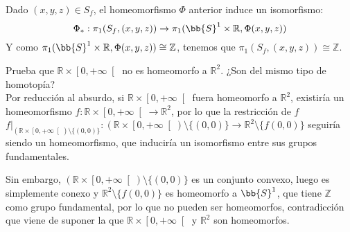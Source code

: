 \begin{ejercicio}
\begin{enumerate}[label=\alph*)]
            Dado $(x,y,z)\in S_f$, el homeomorfismo $\Phi$ anterior induce un isomorfismo:
            \begin{equation*}
                \Phi_\ast:\pi_1(S_f,(x,y,z)) \to \pi_1(\bb{S}^1\times \mathbb{R},\Phi(x,y,z))
            \end{equation*}
            Y como $\pi_1(\bb{S}^1\times \mathbb{R},\Phi(x,y,z))\cong \mathbb{Z}$, tenemos que $\pi_1(S_f,(x,y,z))\cong \mathbb{Z}$.
    \end{enumerate}
\end{ejercicio}

\begin{ejercicio}
    Prueba que $\mathbb{R}\times \left[0,+\infty\right[$ no es homeomorfo a $\mathbb{R}^2$. ¿Son del mismo tipo de homotopía?\\

        \noindent
        Por reducción al absurdo, si $\mathbb{R}\times \left[0,+\infty\right[$ fuera homeomorfo a $\mathbb{R}^2$, existiría un homeomorfismo $f:\mathbb{R}\times \left[0,+\infty\right[\to \mathbb{R}^2$, por lo que la restricción de $f$ \newline$f\big|_{(\mathbb{R}\times \left[0,+\infty\right[)\setminus\{(0,0)\}}:(\mathbb{R}\times \left[0,+\infty\right[)\setminus\{(0,0)\}\to \mathbb{R}^2\setminus\{f(0,0)\}$ seguiría siendo un homeomorfismo, que induciría un isomorfismo entre sus grupos fundamentales.

                        Sin embargo, $(\mathbb{R}\times \left[0,+\infty\right[)\setminus\{(0,0)\}$ es un conjunto convexo, luego es simplemente conexo y $\mathbb{R}^2\setminus\{f(0,0)\}$ es homeomorfo a $\bb{S}^1$, que tiene $\mathbb{Z}$ como grupo fundamental, por lo que no pueden ser homeomorfos, contradicción que viene de suponer la que $\mathbb{R}\times \left[0,+\infty\right[$ y $\mathbb{R}^2$ son homeomorfos.\\


\end{ejercicio}
